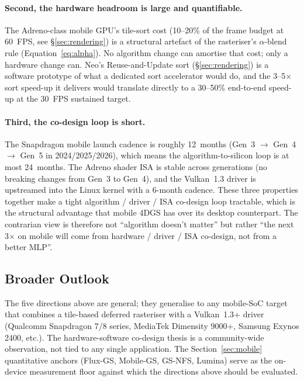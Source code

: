 \paragraph{Second, the hardware headroom is large and quantifiable.}
The Adreno-class mobile GPU's tile-sort cost (10--20\% of the
frame budget at 60~FPS, see \S\ref{sec:rendering}) is a structural
artefact of the rasteriser's $\alpha$-blend rule
(Equation~\eqref{eq:alpha}). No algorithm change can amortise that
cost; only a hardware change can. Neo's Reuse-and-Update sort
(\S\ref{sec:rendering}) is a software prototype of what a
dedicated sort accelerator would do, and the 3--5$\times$ sort
speed-up it delivers would translate directly to a
30--50\% end-to-end speed-up at the 30~FPS sustained target.

\paragraph{Third, the co-design loop is short.}
The Snapdragon mobile launch cadence is roughly 12~months
(Gen~3 $\to$ Gen~4 $\to$ Gen~5 in 2024/2025/2026), which means
the algorithm-to-silicon loop is at most 24~months. The Adreno
shader ISA is stable across generations (no breaking changes
from Gen~3 to Gen~4), and the Vulkan~1.3 driver is upstreamed
into the Linux kernel with a 6-month cadence. These three
properties together make a tight algorithm / driver / ISA
co-design loop tractable, which is the structural advantage
that mobile 4DGS has over its desktop counterpart. The
contrarian view is therefore not ``algorithm doesn't matter''
but rather ``the next 3$\times$ on mobile will come from
hardware / driver / ISA co-design, not from a better MLP''.

\subsection{Broader Outlook}
The five directions above are general; they
generalise to any mobile-SoC target that combines a
tile-based deferred rasteriser with a Vulkan~1.3+ driver
(Qualcomm Snapdragon 7/8 series, MediaTek Dimensity 9000+,
Samsung Exynos 2400, etc.). The hardware-software co-design
thesis is a community-wide observation, not tied to any
single application. The Section~\ref{sec:mobile} quantitative
anchors (Flux-GS, Mobile-GS, GS-NFS, Lumina) serve as the
on-device measurement floor against which the directions
above should be evaluated.

